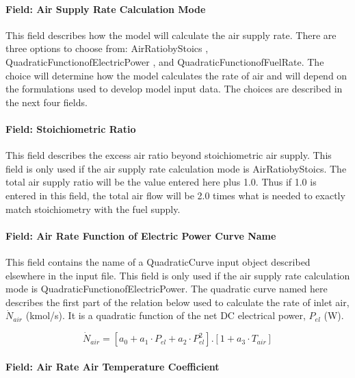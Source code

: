 \paragraph{Field: Air Supply Rate Calculation Mode}\label{field-air-supply-rate-calculation-mode}

This field describes how the model will calculate the air supply rate. There are three options to choose from: AirRatiobyStoics , QuadraticFunctionofElectricPower , and QuadraticFunctionofFuelRate. The choice will determine how the model calculates the rate of air and will depend on the formulations used to develop model input data. The choices are described in the next four fields.

\paragraph{Field: Stoichiometric Ratio}\label{field-stoichiometric-ratio}

This field describes the excess air ratio beyond stoichiometric air supply. This field is only used if the air supply rate calculation mode is AirRatiobyStoics. The total air supply ratio will be the value entered here plus 1.0. Thus if 1.0 is entered in this field, the total air flow will be 2.0 times what is needed to exactly match stoichiometry with the fuel supply.

\paragraph{Field: Air Rate Function of Electric Power Curve Name}\label{field-air-rate-function-of-electric-power-curve-name}

This field contains the name of a QuadraticCurve input object described elsewhere in the input file. This field is only used if the air supply rate calculation mode is QuadraticFunctionofElectricPower. The quadratic curve named here describes the first part of the relation below used to calculate the rate of inlet air, \({\dot N_{air}}\) (kmol/s). It is a quadratic function of the net DC electrical power, \({P_{el}}\) (W).

\begin{equation}
{\dot N_{air}} = \left[ {{a_0} + {a_1} \cdot {P_{el}} + {a_2} \cdot P_{el}^2} \right].\left[ {1 + {a_3} \cdot {T_{air}}} \right]
\end{equation}

\paragraph{Field: Air Rate Air Temperature Coefficient}\label{field-air-rate-air-temperature-coefficient}


